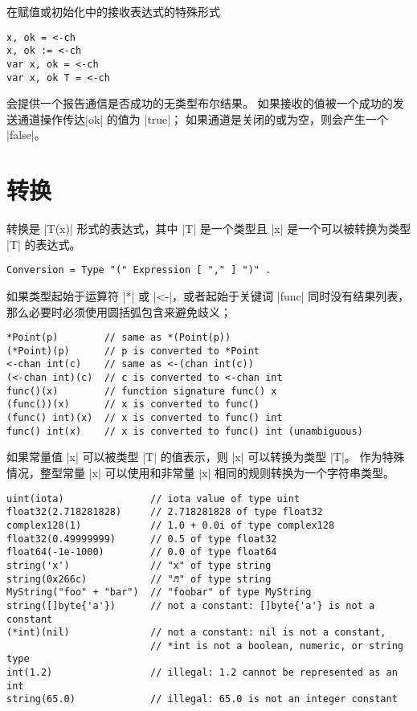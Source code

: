 在赋值或初始化中的接收表达式的特殊形式
\begin{lstlisting}[style=golang]
x, ok = <-ch
x, ok := <-ch
var x, ok = <-ch
var x, ok T = <-ch
\end{lstlisting}
会提供一个报告通信是否成功的无类型布尔结果。
如果接收的值被一个成功的发送通道操作传达\code|ok| 的值为 \code|true|；
如果通道是关闭的或为空，则会产生一个 \code|false|。

\section{转换}
转换是 \code|T(x)| 形式的表达式，其中 \code|T| 是一个类型且 \code|x| 是一个可以被转换为类型 \code|T| 的表达式。
\begin{lstlisting}[style=EBNF]
Conversion = Type "(" Expression [ "," ] ")" .
\end{lstlisting}
如果类型起始于运算符 \code|*| 或 \code|<-|，或者起始于关键词 \code|func| 同时没有结果列表，那么必要时必须使用圆括弧包含来避免歧义；
\begin{lstlisting}[style=golang]
*Point(p)        // same as *(Point(p))
(*Point)(p)      // p is converted to *Point
<-chan int(c)    // same as <-(chan int(c))
(<-chan int)(c)  // c is converted to <-chan int
func()(x)        // function signature func() x
(func())(x)      // x is converted to func()
(func() int)(x)  // x is converted to func() int
func() int(x)    // x is converted to func() int (unambiguous)
\end{lstlisting}
如果常量值 \code|x| 可以被类型 \code|T| 的值表示，则 \code|x| 可以转换为类型 \code|T|。
作为特殊情况，整型常量 \code|x| 可以使用和非常量 \code|x| 相同的规则转换为一个字符串类型。
\begin{lstlisting}[style=golang]
uint(iota)               // iota value of type uint
float32(2.718281828)     // 2.718281828 of type float32
complex128(1)            // 1.0 + 0.0i of type complex128
float32(0.49999999)      // 0.5 of type float32
float64(-1e-1000)        // 0.0 of type float64
string('x')              // "x" of type string
string(0x266c)           // "♬" of type string
MyString("foo" + "bar")  // "foobar" of type MyString
string([]byte{'a'})      // not a constant: []byte{'a'} is not a constant
(*int)(nil)              // not a constant: nil is not a constant, 
						 // *int is not a boolean, numeric, or string type
int(1.2)                 // illegal: 1.2 cannot be represented as an int
string(65.0)             // illegal: 65.0 is not an integer constant
\end{lstlisting}

